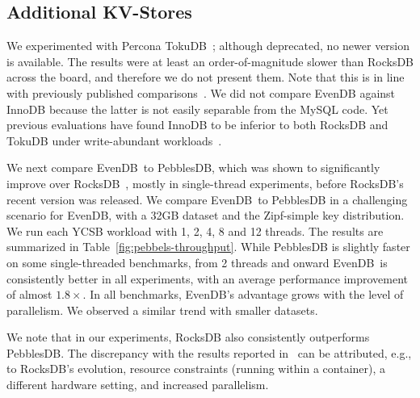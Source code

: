 \documentclass[sigplan,10pt]{acmart}
\newcommand{\remove}[1]{}
\newcommand{\sys}{EvenDB}
\providecommand{\DIFadd}[1]{{\protect\color{blue}\uwave{#1}}} %
\providecommand{\DIFdel}[1]{{\protect\color{red}\sout{#1}}}                      %
\providecommand{\DIFaddbegin}{} %
\providecommand{\DIFaddend}{} %
\providecommand{\DIFdelbegin}{} %
\providecommand{\DIFdelend}{} %
\begin{document}
\DIFdelend \remove{
Note that the scan speed is  higher for the 8GB dataset vs the 4GB dataset. 
Both are quite fast as they are served from memory, but in the smaller dataset there is more contention 
between scans and puts, which slows down   progress. }



\subsection{Additional KV-Stores}
\label{ssec:pebbles} 

We experimented with Percona TokuDB~\cite{TokuDBgit}; although deprecated, no newer version is available. 
The results were at least an order-of-magnitude slower than RocksDB across the board, and therefore we do not present them. 
Note that this is in line with previously published comparisons~\cite{DBLP:conf/cidr/DongCGBSS17,tucana,toku-rocks-inno}.
We did not compare \sys\/  against
InnoDB because the latter is not easily separable 
from the MySQL code. Yet previous evaluations have found  InnoDB to be inferior to both RocksDB and TokuDB under 
write-abundant workloads~\cite{toku-rocks-inno}.

We next compare \sys\ to PebblesDB, which was shown to significantly improve over RocksDB~\cite{PebblesDB},
mostly in single-thread experiments, before RocksDB's recent version was released.  
We compare \sys\ to PebblesDB in a challenging  scenario for \sys, with a 32GB dataset and the Zipf-simple key 
distribution. We run each YCSB workload with 1, 2, 4, 8 and 12 threads. The results are summarized in Table~\ref{fig:pebbels-throughput}. 
While PebblesDB is slightly faster on some single-threaded benchmarks, from 2 threads and onward \sys\ is consistently better in all experiments, 
with an average performance improvement of almost \DIFdelbegin \DIFdel{$1.8\times$}\DIFdelend \DIFaddbegin \DIFadd{1.8x}\DIFaddend .  In all benchmarks, 
 \sys's advantage grows with the level of parallelism. We observed a similar trend with smaller datasets. 

We note that in our experiments, RocksDB also consistently outperforms PebblesDB. 
The discrepancy with the results reported in~\cite{PebblesDB} 
can be attributed, e.g., to RocksDB's evolution, resource constraints (running within a 
container), a different hardware setting, and increased  parallelism.   
\end{document}
